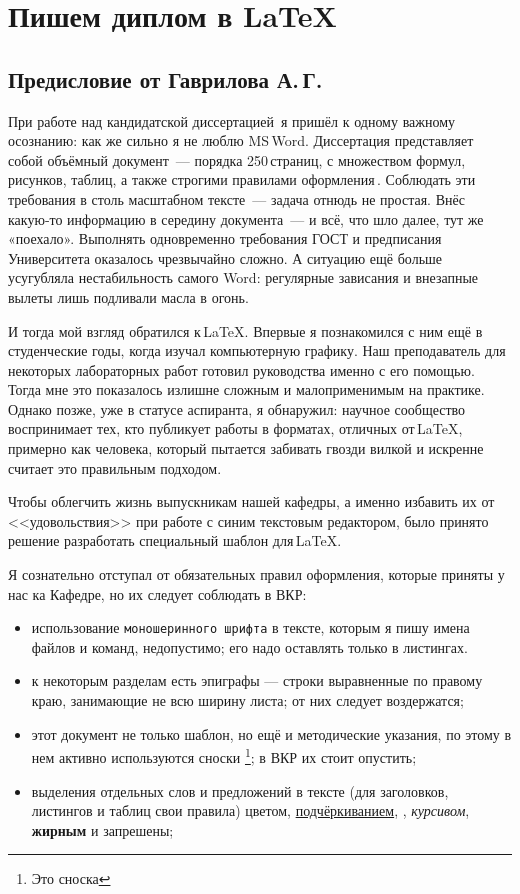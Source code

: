\section{Пишем диплом в \LaTeX{}}


\subsection{Предисловие от Гаврилова А.\,Г.}

При работе над кандидатской диссертацией \cite{gvr:ktn} я пришёл к одному важному осознанию: как же сильно я не люблю MS Word. Диссертация представляет собой объёмный документ~--- порядка 250 страниц, с множеством формул, рисунков, таблиц, а также строгими правилами оформления \cite{gost:diser}. Соблюдать эти требования в столь масштабном тексте~--- задача отнюдь не простая. Внёс какую‑то информацию в середину документа~--- и всё, что шло далее, тут же «поехало». Выполнять одновременно требования ГОСТ и предписания Университета оказалось чрезвычайно сложно. А ситуацию ещё больше усугубляла нестабильность самого Word: регулярные зависания и внезапные вылеты лишь подливали масла в огонь.

И тогда мой взгляд обратился к \LaTeX{}. Впервые я познакомился с ним ещё в студенческие годы, когда изучал компьютерную графику. Наш преподаватель для некоторых лабораторных работ готовил руководства именно с его помощью. Тогда мне это показалось излишне сложным и малоприменимым на практике. Однако позже, уже в статусе аспиранта, я обнаружил: научное сообщество воспринимает тех, кто публикует работы в форматах, отличных от \LaTeX{}, примерно как человека, который пытается забивать гвозди вилкой и искренне считает это правильным подходом.

Чтобы облегчить жизнь выпускникам нашей кафедры, а именно избавить их от <<удовольствия>> при работе с синим текстовым редактором,  было принято решение разработать специальный шаблон для \LaTeX{}.

\marginnote[\color{red}\Large\textbf{!!!$\to$}]{}%
Я сознательно отступал от обязательных правил оформления, которые приняты у нас ка Кафедре, но их следует соблюдать в ВКР:
\begin{itemize}
	\item использование \Verb |моношеринного шрифта| в тексте, которым я пишу имена файлов и команд,  недопустимо; его надо оставлять только в листингах.
	\item к некоторым разделам есть эпиграфы --- строки выравненные по правому краю, занимающие не всю ширину листа; от них  следует воздержатся;
	\item этот документ не только шаблон, но ещё и методические указания, по этому в нем активно используются сноски \footnote{Это сноска}; в ВКР их стоит опустить;
	\item выделения отдельных слов и предложений в тексте (для заголовков, листингов и таблиц свои правила)  { \color{red}цветом}, \underline{подчёркиванием}, , \textit{курсивом}, \textbf{жирным} и    запрешены; 
\end{itemize}

